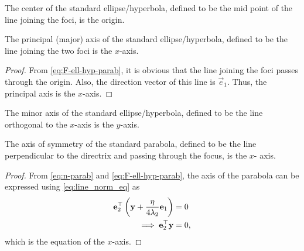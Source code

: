 
	\begin{corollary}
			\label{corr:center}
			The center of the standard ellipse/hyperbola, defined to be the mid point of the line joining the foci, is the origin.
	\end{corollary}
	\begin{corollary}
		\label{corr:axis}
			The principal (major) axis of the standard ellipse/hyperbola, defined to be the line joining the two foci   is the $x$-axis.  
	\end{corollary}
	\begin{proof}
		From 	\eqref{eq:F-ell-hyp-parab}, it is obvious that the line joining the foci passes through the origin.  Also, the direction vector of this line is $\vec{e}_1$.  Thus, the principal axis is the $x$-axis. 
	\end{proof}
	\begin{corollary}
		\label{corr:minor-axis}
			The minor axis of the standard ellipse/hyperbola, defined to be the line orthogonal to the $x$-axis is the $y$-axis. 
	\end{corollary}


	\begin{corollary}
			The axis of symmetry of the standard parabola, defined to be the line perpendicular to the directrix and passing through the focus,  is the $x$- axis.
	\end{corollary}
	\begin{proof}
	From \eqref{eq:n-parab} and 	
					\eqref{eq:F-ell-hyp-parab}, 
					the axis of the parabola  can be expressed using 
    \eqref{eq:line_norm_eq} as 
		\begin{align}
			\mathbf{e}_2^{\top}\left(\mathbf{y}  
			+\frac{\eta}{4\lambda_2}\mathbf{e}_1\right) &= 0
			\\
			\implies \mathbf{e}_2^{\top}\mathbf{y} &= 0
					\label{eq:axis-std-parab}, 
		\end{align}
		which is the equation of the $x$-axis.
	\end{proof}


